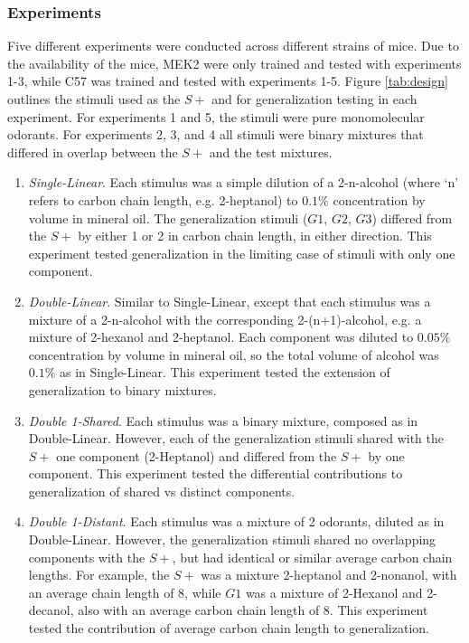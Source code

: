 \subsubsection*{Experiments}
\label{sec:methods_experiment_types}
Five different experiments were conducted across different strains of mice. 
Due to the availability of the mice, MEK2 were only trained and tested with experiments 1-3, while C57 was trained and tested with experiments 1-5.  
Figure \ref{tab:design} outlines the stimuli used as the $S+$ and for generalization testing in each experiment. 
For experiments 1 and 5, the stimuli were pure monomolecular odorants. 
For experiments 2, 3, and 4 all stimuli were binary mixtures that differed in overlap between the $S+$ and the test mixtures. 

\begin{enumerate}[a]
\item \textit{Single-Linear}. Each stimulus was a simple dilution of a 2-n-alcohol (where `n' refers to carbon chain length, e.g. 2-heptanol) to $0.1\%$ concentration by volume in mineral oil.
The generalization stimuli ($G1$, $G2$, $G3$) differed from the $S+$ by either 1 or 2 in carbon chain length, in either direction.  
This experiment tested generalization in the limiting case of stimuli with only one component.   

\item \textit{Double-Linear}. Similar to Single-Linear, except that each stimulus was a mixture of a 2-n-alcohol with the corresponding 2-(n+1)-alcohol, e.g. a mixture of 2-hexanol and 2-heptanol.  
Each component was diluted to $0.05\%$ concentration by volume in mineral oil, so the total volume of alcohol was $0.1\%$ as in Single-Linear.  
This experiment tested the extension of generalization to binary mixtures.  

\item \textit{Double 1-Shared}. Each stimulus was a binary mixture, composed as in Double-Linear. 
However, each of the generalization stimuli shared with the $S+$ one component (2-Heptanol) and differed from the $S+$ by one component.  
This experiment tested the differential contributions to generalization of shared vs distinct components.  

\item \textit{Double 1-Distant}. Each stimulus was a mixture of 2 odorants, diluted as in Double-Linear. However, the generalization stimuli shared no overlapping components with the $S+$, but had identical or similar average carbon chain lengths. 
For example, the $S+$ was a mixture 2-heptanol and 2-nonanol, with an average chain length of 8, while $G1$ was a mixture of 2-Hexanol and 2-decanol, also with an average carbon chain length of 8.  This experiment tested the contribution of average carbon chain length to generalization.  


\end{enumerate}
